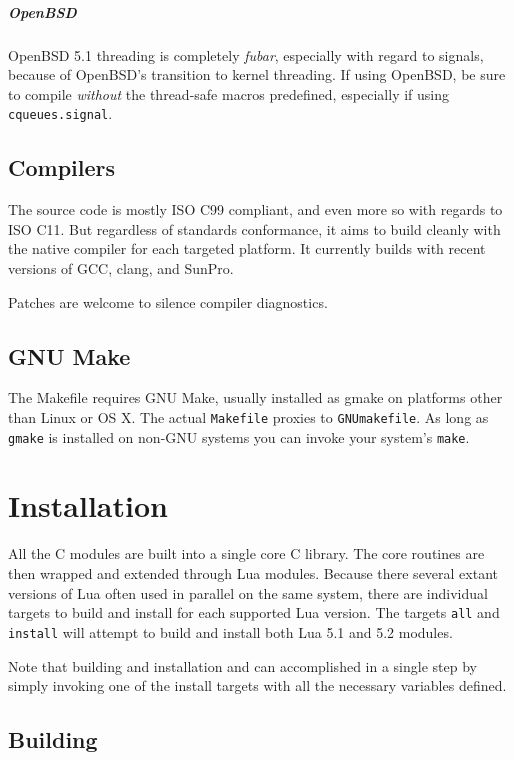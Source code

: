 \documentclass[11pt, oneside]{memoir}
\newcommand*{\module}[1]{\texttt{#1}\xspace}
\begin{document}
\paragraph{OpenBSD}
OpenBSD 5.1 threading is completely \emph{fubar}, especially with regard to signals, because of OpenBSD's transition to kernel threading. If using OpenBSD, be sure to compile \emph{without} the thread-safe macros predefined, especially if using \module{cqueues.signal}.

\section{Compilers}

The source code is mostly ISO C99 compliant, and even more so with regards to ISO C11. But regardless of standards conformance, it aims to build cleanly with the native compiler for each targeted platform. It currently builds with recent versions of GCC, clang, and SunPro.

Patches are welcome to silence compiler diagnostics.

\section{GNU Make}

The Makefile requires GNU Make, usually installed as gmake on platforms other than Linux or OS X. The actual \texttt{Makefile} proxies to \texttt{GNUmakefile}. As long as \texttt{gmake} is installed on non-GNU systems you can invoke your system's \texttt{make}.

\chapter{Installation}

All the C modules are built into a single core C library. The core routines are then wrapped and extended through Lua modules. Because there several extant versions of Lua often used in parallel on the same system, there are individual targets to build and install for each supported Lua version. The targets \texttt{all} and \texttt{install} will attempt to build and install both Lua 5.1 and 5.2 modules.

Note that building and installation and can accomplished in a single step by simply invoking one of the install targets with all the necessary variables defined.

\section{Building}
\end{document}

